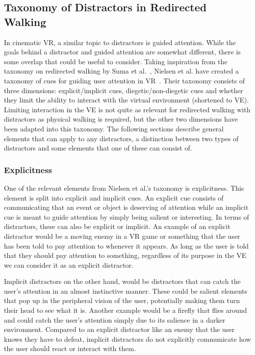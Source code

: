 \subsection{Taxonomy of Distractors in Redirected Walking}\label{sec:distractorTaxonomy}
In cinematic VR, a similar topic to distractors is guided attention. While the goals behind a distractor and guided attention are somewhat different, there is some overlap that could be useful to consider. Taking inspiration from the taxonomy on redirected walking by Suma et al.~\cite{suma2012taxonomy}, Nielsen et al. have created a taxonomy of cues for guiding user attention in VR~\cite{nielsen2016missing}. Their taxonomy consists of three dimensions: explicit/implicit cues, diegetic/non-diegetic cues and whether they limit the ability to interact with the virtual environment (shortened to VE). Limiting interaction in the VE is not quite as relevant for redirected walking with distractors as physical walking is required, but the other two dimensions have been adapted into this taxonomy. The following sections describe general elements that can apply to any distractors, a distinction between two types of distractors and some elements that one of these can consist of. 
\subsubsection{Explicitness}
One of the relevant elements from Nielsen et al.'s taxonomy is explicitness. This element is split into explicit and implicit cues. An explicit cue consists of communicating that an event or object is deserving of attention while an implicit cue is meant to guide attention by simply being salient or interesting. In terms of distractors, these can also be explicit or implicit. An example of an explicit distractor would be a moving enemy in a VR game or something that the user has been told to pay attention to whenever it appears. As long as the user is told that they should pay attention to something, regardless of its purpose in the VE we can consider it as an explicit distractor. 

Implicit distractors on the other hand, would be distractors that can catch the user's attention in an almost instinctive manner. These could be salient elements that pop up in the peripheral vision of the user, potentially making them turn their head to see what it is. Another example would be a firefly that flies around and could catch the user's attention simply due to its salience in a darker environment. Compared to an explicit distractor like an enemy that the user knows they have to defeat, implicit distractors do not explicitly communicate how the user should react or interact with them. 


